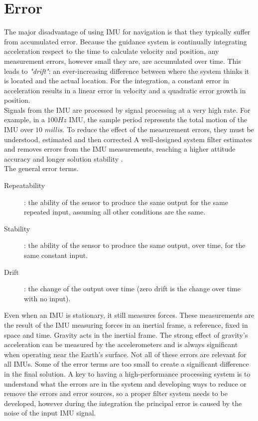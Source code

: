 \documentclass{standalone}
\begin{document}
\section{Error}\label{Error}
The major disadvantage of using IMU for navigation is that they typically suffer from accumulated error. Because the guidance system is continually integrating acceleration respect to the time to calculate velocity and position, any measurement errors, however small they are, are accumulated over time. This leads to \textit{"drift"}: an ever-increasing difference between where the system thinks it is located and the actual location. For the integration, a constant error in acceleration results in a linear error in velocity and a quadratic error growth in position.\cite{siciliano2016springer}\\
Signals from the IMU are processed by signal processing at a very high rate. For example, in a $100 Hz$ IMU, the sample period represents the total motion of the IMU over $10$ $ \si{milli\second}$. 
To reduce the effect of the measurement errors, they must be understood, estimated and then corrected
A well-designed system filter estimates and removes errors from the IMU measurements, reaching a higher attitude accuracy and longer solution stability .\\
The general error terms.
\begin{description}
\item [Repeatability]: the ability of the sensor to produce the same output for the same repeated input, assuming all other conditions are the same.
\item [Stability]: the ability of the sensor to produce the same output, over time, for the same constant input. 
\item [Drift]: the change of the output over time (zero drift is the change over time with no input).
\end{description}
Even when an IMU is stationary, it still measures forces. These measurements are the result of the IMU measuring forces in an inertial frame, a reference, fixed in space and time. Gravity acts in the inertial frame. The strong effect of gravity’s acceleration  can be measured by the accelerometers and is always significant when operating near the Earth’s surface.
Not all of these errors are relevant for all IMUs. Some of the error terms are too small to create a significant difference in the final solution. A key to having a high-performance processing system is to understand what the errors are in the system and developing ways to reduce or remove the errors and error sources, so a proper filter system needs to be developed, however during the integration the principal error is caused by the noise of the input IMU signal.
\end{document}
